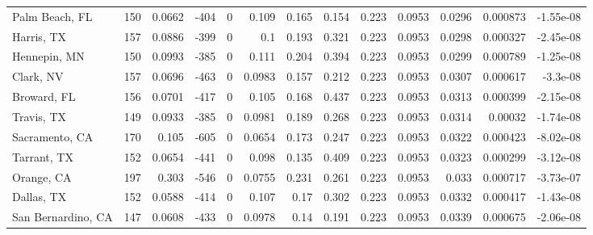 \documentclass[12pt,letterpaper]{article}
\begin{document}
{\begin{appendices}
\begin{sidewaystable}
{\begin{tabular}{lrrrrrrrrrrrr}
 Palm Beach, FL     & 150   & 0.0662  & -404   &     0 &          0.109  &           0.165  &         0.154  &              0.223 &             0.0953 &           0.0296  &        0.000873 &       -1.55e-08  \\
 Harris, TX         & 157   & 0.0886  & -399   &     0 &          0.1    &           0.193  &         0.321  &              0.223 &             0.0953 &           0.0298  &        0.000327 &       -2.45e-08  \\
 Hennepin, MN       & 150   & 0.0993  & -385   &     0 &          0.111  &           0.204  &         0.394  &              0.223 &             0.0953 &           0.0299  &        0.000789 &       -1.25e-08  \\
 Clark, NV          & 157   & 0.0696  & -463   &     0 &          0.0983 &           0.157  &         0.212  &              0.223 &             0.0953 &           0.0307  &        0.000617 &       -3.3e-08   \\
 Broward, FL        & 156   & 0.0701  & -417   &     0 &          0.105  &           0.168  &         0.437  &              0.223 &             0.0953 &           0.0313  &        0.000399 &       -2.15e-08  \\
 Travis, TX         & 149   & 0.0933  & -385   &     0 &          0.0981 &           0.189  &         0.268  &              0.223 &             0.0953 &           0.0314  &        0.00032  &       -1.74e-08  \\
 Sacramento, CA     & 170   & 0.105   & -605   &     0 &          0.0654 &           0.173  &         0.247  &              0.223 &             0.0953 &           0.0322  &        0.000423 &       -8.02e-08  \\
 Tarrant, TX        & 152   & 0.0654  & -441   &     0 &          0.098  &           0.135  &         0.409  &              0.223 &             0.0953 &           0.0323  &        0.000299 &       -3.12e-08  \\
 Orange, CA         & 197   & 0.303   & -546   &     0 &          0.0755 &           0.231  &         0.261  &              0.223 &             0.0953 &           0.033   &        0.000717 &       -3.73e-07  \\
 Dallas, TX         & 152   & 0.0588  & -414   &     0 &          0.107  &           0.17   &         0.302  &              0.223 &             0.0953 &           0.0332  &        0.000417 &       -1.43e-08  \\
 San Bernardino, CA & 147   & 0.0608  & -433   &     0 &          0.0978 &           0.14   &         0.191  &              0.223 &             0.0953 &           0.0339  &        0.000675 &       -2.06e-08  \\

\end{tabular}}
\end{sidewaystable}
\end{appendices}}
\end{document}

